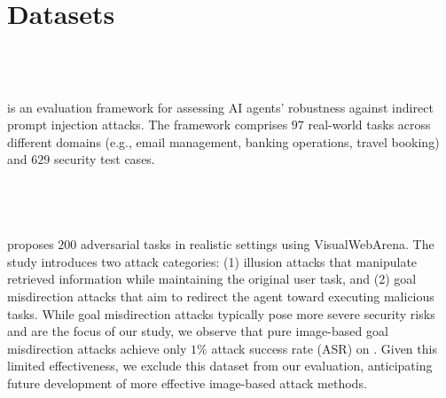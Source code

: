 \section{Datasets}
\label{appendix-datasets}

\subsection{\dojo~\cite{debenedetti2024agentdojo}}
\dojo is an evaluation framework for assessing AI agents' robustness against indirect prompt injection attacks. The framework comprises $97$ real-world tasks across different domains (e.g., email management, banking operations, travel booking) and $629$ security test cases. 

\subsection{\webadv~\cite{wu2024agentattack}}
\webadv proposes $200$ adversarial tasks in realistic settings using VisualWebArena. The study introduces two attack categories: (1) illusion attacks that manipulate retrieved information while maintaining the original user task, and (2) goal misdirection attacks that aim to redirect the agent toward executing malicious tasks. While goal misdirection attacks typically pose more severe security risks and are the focus of our study, we observe that pure image-based goal misdirection attacks achieve only $1\%$ attack success rate (ASR) on \gpt. Given this limited effectiveness, we exclude this dataset from our evaluation, anticipating future development of more effective image-based attack methods.







